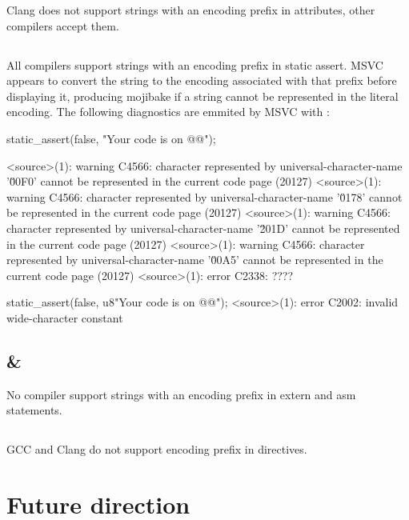 \documentclass{wg21}
\begin{document}
Clang does not support strings with an encoding prefix in attributes, other compilers accept them.


\subsection{}

All compilers support strings with an encoding prefix in static assert.
MSVC appears to convert the string to the encoding associated with that prefix before displaying it, producing mojibake if a string
cannot be represented in the literal encoding.
The following diagnostics are emmited by MSVC with :
\begin{quoteblock}
\begin{codeblock}
static_assert(false, "Your code is on @@");

<source>(1): warning C4566: character represented by universal-character-name
'\u00F0'  cannot be represented in the current code page (20127)
<source>(1): warning C4566: character represented by universal-character-name
'\u0178'  cannot be represented in the current code page (20127)
<source>(1): warning C4566: character represented by universal-character-name
'\u201D' cannot be represented in the current code page (20127)
<source>(1): warning C4566: character represented by universal-character-name
'\u00A5' cannot be represented in the current code page (20127)
<source>(1): error C2338: ????

static_assert(false, u8"Your code is on @@");
<source>(1): error C2002: invalid wide-character constant
\end{codeblock}
\end{quoteblock}
\subsection{ \& }

No compiler support strings with an encoding prefix in extern and asm statements.

\subsection{}

GCC and  Clang do not support encoding prefix in  directives.

\section{Future direction}
\end{document}
